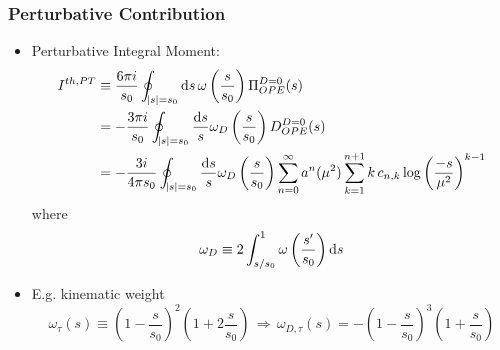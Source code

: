 \documentclass{beamer}
\begin{document}
\begin{frame}
  \frametitle{Perturbative Contribution}
  \begin{itemize}
  \item Perturbative Integral Moment:
    \begin{equation}
      \begin{split}
        I^{th,PT} &\equiv \frac{6 \pi i}{s_0} \oint_{\abs{s}=s_0} \dif s\, \omega\left(\frac{s}{s_0}\right) \Pi_{OPE}^{D=0}(s) \\
        &= -\frac{3 \pi i}{s_0} \oint_{\abs{s}=s_0} \frac{\dif s}{s} \omega_D\left(\frac{s}{s_0}\right) D_{OPE}^{D=0}(s) \\
        &= -\frac{3 i}{4 \pi s_0} \oint_{\abs{s}=s_0} \frac{\dif s}{s}
        \omega_D\left(\frac{s}{s_0}\right) \sum_{n=0}^\infty a^n(\mu^2)
        \sum_{k=1}^{n+1} k\, c_{n,k} \log\left( \frac{-s}{\mu^2} \right)^{k-1}
      \end{split}
    \end{equation}
    where
    \begin{equation}
      \omega_D \equiv 2 \int_{s/s_0}^{1} \omega\left( \frac{s^\prime}{s_0} \right) \dif s
    \end{equation}
  \item E.g. kinematic weight
    \begin{equation}
      \omega_\tau(s) \equiv \left(1 - \frac{s}{s_0}\right)^2\left( 1 + 2 \frac{s}{s_0} \right)
      \, \Rightarrow \,
      \omega_{D, \tau}(s) = -\left(1-\frac{s}{s_0}\right)^3 \left(1+\frac{s}{s_0}\right) 
    \end{equation}
  \end{itemize}
\end{frame}
\end{document}
